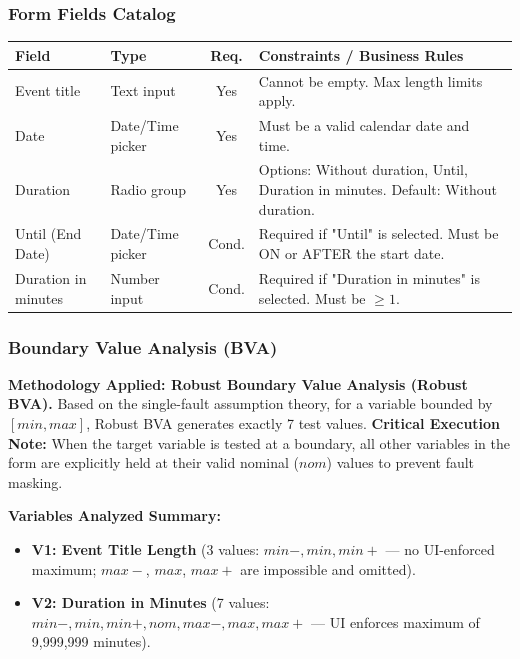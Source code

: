 \documentclass[twoside,final]{hcmut-report}
\begin{document}
\subsubsection{Form Fields Catalog}
\begin{table}[H]
\centering
\renewcommand{\arraystretch}{1.3}
\begin{tabularx}{\textwidth}{|l|l|c|X|}
\hline
\textbf{Field} & \textbf{Type} & \textbf{Req.} & \textbf{Constraints / Business Rules} \\ \hline
Event title & Text input & Yes & Cannot be empty. Max length limits apply. \\ \hline
Date & Date/Time picker & Yes & Must be a valid calendar date and time. \\ \hline
Duration & Radio group & Yes & Options: Without duration, Until, Duration in minutes. Default: Without duration. \\ \hline
Until (End Date) & Date/Time picker & Cond. & Required if "Until" is selected. Must be ON or AFTER the start date. \\ \hline
Duration in minutes & Number input & Cond. & Required if "Duration in minutes" is selected. Must be $\geq 1$. \\ \hline
\end{tabularx}
\end{table}

\subsubsection{Boundary Value Analysis (BVA)}
\textbf{Methodology Applied: Robust Boundary Value Analysis (Robust BVA).} 
Based on the single-fault assumption theory, for a variable bounded by $[min, max]$, Robust BVA generates exactly 7 test values. \textbf{Critical Execution Note:} When the target variable is tested at a boundary, all other variables in the form are explicitly held at their valid nominal ($nom$) values to prevent fault masking.

\textbf{Variables Analyzed Summary:}
\begin{itemize}
    \item \textbf{V1: Event Title Length} (3 values: $min-, min, min+$ — no UI-enforced maximum; $max-$, $max$, $max+$ are impossible and omitted).
    \item \textbf{V2: Duration in Minutes} (7 values: $min-, min, min+, nom, max-, max, max+$ — UI enforces maximum of 9{,}999{,}999 minutes).
\end{itemize}
\end{document}

